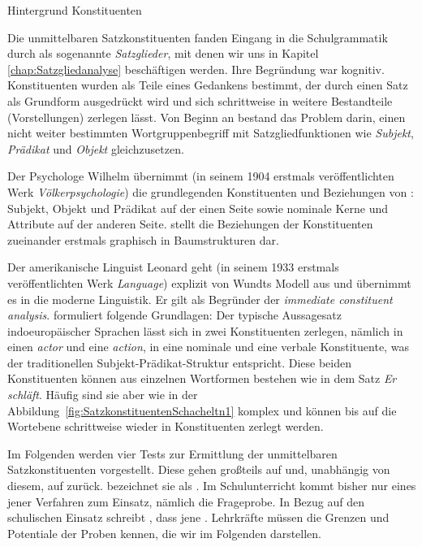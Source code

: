 \begin{Exkurs}{Hintergrund Konstituenten}
\label{ExkursHintergrundKonstituenten}

Die unmittelbaren Satzkonstituenten fanden Eingang in die Schulgrammatik durch \citet{Becker1845} als sogenannte \textit{Satzglieder}, mit denen wir uns in Kapitel \ref{chap:Satzgliedanalyse} beschäftigen werden. Ihre Begründung war kognitiv. Konstituenten wurden als Teile eines Gedankens bestimmt, der durch einen Satz als Grundform ausgedrückt wird und sich schrittweise in weitere Bestandteile (Vorstellungen) zerlegen lässt. Von Beginn an bestand das Problem darin, einen nicht weiter bestimmten Wortgruppenbegriff mit Satzgliedfunktionen wie \textit{Subjekt}, \textit{Prädikat} und \textit{Objekt} gleichzusetzen.  

Der Psychologe Wilhelm \citet[321--324]{Wundt1922Sprache2} übernimmt (in seinem 1904 erstmals veröffentlichten Werk \textit{Völkerpsychologie}) die grundlegenden Konstituenten und Beziehungen von \citet[205]{Becker1845}: Subjekt, Objekt und Prädikat auf der einen Seite sowie nominale Kerne und Attribute auf der anderen Seite. \citet[333, 362]{Wundt1922Sprache2} stellt die Beziehungen der Konstituenten zueinander erstmals graphisch in Baumstrukturen dar. 

Der amerikanische Linguist Leonard \citet[vii]{Bloomfield1935} geht (in seinem 1933 erstmals veröffentlichten Werk \textit{Language}) explizit von Wundts Modell aus und übernimmt es in die moderne Linguistik. Er gilt als Begründer der \textit{immediate constituent analysis}. \citet[161, 170--185]{Bloomfield1935} formuliert folgende Grundlagen: Der typische Aussagesatz indoeuropäischer Sprachen lässt sich in zwei Konstituenten zerlegen, nämlich in einen \textit{actor} und eine \textit{action}, in eine nominale und eine verbale Konstituente, was der traditionellen Subjekt-Prädikat-Struktur entspricht. Diese beiden Konstituenten können aus einzelnen Wortformen bestehen wie in dem Satz \textit{Er schläft}. Häufig sind sie aber wie in der Abbildung~\ref{fig:SatzkonstituentenSchacheltn1} komplex und können bis auf die Wortebene schrittweise wieder in Konstituenten zerlegt werden. 

Im Folgenden werden vier Tests zur Ermittlung der unmittelbaren Satzkonstituenten vorgestellt. Diese gehen großteils auf \citet{Bloomfield1935} und, unabhängig von diesem, auf \citet{Glinz1952} zurück. \citet[58]{Glinz1952} bezeichnet sie als . Im Schulunterricht kommt bisher nur eines jener Verfahren zum Einsatz, nämlich die Frageprobe. In Bezug auf den schulischen Einsatz schreibt \citet[242]{Bredel2013}, dass jene . Lehrkräfte müssen die Grenzen und Potentiale der Proben kennen, die wir im Folgenden darstellen.  

\end{Exkurs}


